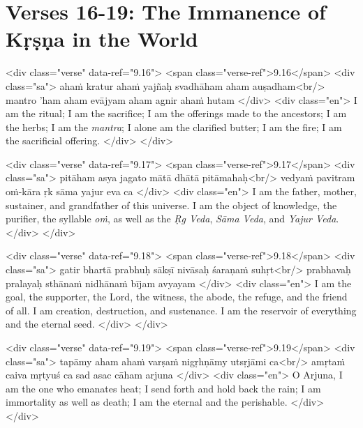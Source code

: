 \section{Verses 16-19: The Immanence of Kṛṣṇa in the World}\label{sec-verses-16-19-the-immanence-of-krsna-in-the-world}


\begin{html}
<div class="verse" data-ref="9.16">
  <span class="verse-ref">9.16</span>
  <div class="sa">
    ahaṁ kratur ahaṁ yajñaḥ svadhāham aham auṣadham<br/>
    mantro ’ham aham evājyam aham agnir ahaṁ hutam
  </div>
  <div class="en">
    I am the ritual; I am the sacrifice; I am the offerings made to the ancestors; I am the herbs; I am the \textit{mantra}; I alone am the clarified butter; I am the fire; I am the sacrificial offering.
  </div>
</div>
\end{html}



\begin{html}
<div class="verse" data-ref="9.17">
  <span class="verse-ref">9.17</span>
  <div class="sa">
    pitāham asya jagato mātā dhātā pitāmahaḥ<br/>
    vedyaṁ pavitram oṁ-kāra ṛk sāma yajur eva ca
  </div>
  <div class="en">
    I am the father, mother, sustainer, and grandfather of this universe. I am the object of knowledge, the purifier, the syllable \textit{oṁ}, as well as the \textit{Ṛg Veda}, \textit{Sāma Veda}, and \textit{Yajur Veda}.
  </div>
</div>
\end{html}



\begin{html}
<div class="verse" data-ref="9.18">
  <span class="verse-ref">9.18</span>
  <div class="sa">
    gatir bhartā prabhuḥ sākṣī nivāsaḥ śaraṇaṁ suhṛt<br/>
    prabhavaḥ pralayaḥ sthānaṁ nidhānaṁ bījam avyayam
  </div>
  <div class="en">
    I am the goal, the supporter, the Lord, the witness, the abode, the refuge, and the friend of all. I am creation, destruction, and sustenance. I am the reservoir of everything and the eternal seed.
  </div>
</div>
\end{html}



\begin{html}
<div class="verse" data-ref="9.19">
  <span class="verse-ref">9.19</span>
  <div class="sa">
    tapāmy aham ahaṁ varṣaṁ nigṛhṇāmy utsṛjāmi ca<br/>
    amṛtaṁ caiva mṛtyuś ca sad asac cāham arjuna
  </div>
  <div class="en">
    O Arjuna, I am the one who emanates heat; I send forth and hold back the rain; I am immortality as well as death; I am the eternal and the perishable.
  </div>
</div>
\end{html}



